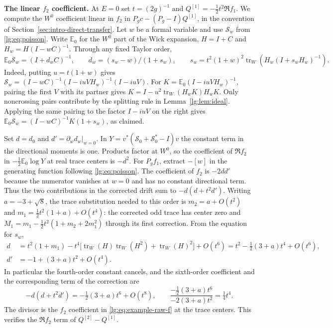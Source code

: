 \documentclass[11pt]{article}
\numberwithin{equation}{section}
\theoremstyle{remark}
\newcommand{\E}{\mathbb E}
\begin{document}
\medskip\noindent\textbf{The linear $f_2$ coefficient.}
At $E=0$ set $t=(2g)^{-1}$ and $Q^{[1]}=-\tfrac12 t^2\Re f_1$.
We compute the $W^0$ coefficient linear in $f_2$ in
$P_gc-(P_g-I)Q^{[1]}$, in the convention of Section~\ref{sec:intro-direct-transfer}.
Let $w$ be a formal variable and use $\mathcal S_w$ from \eqref{lg:eq:poisson}.
Write $\E_0$ for the $W^0$ part of the Wick expansion,
$H=I+C$ and $H_w=H(I-wC)^{-1}$. Through any fixed Taylor order,
\[
 \E_0\mathcal S_w=(I+d_w C)^{-1},\qquad
 d_w=(s_w-w)/(1+s_w),\qquad
 s_w=t^2(1+w)^2\operatorname{tr}_W\!\left(H_w(I+s_w H_w)^{-1}\right).
\]
Indeed, putting $u=t(1+w)$ gives
$\mathcal S_w=(I-wC)^{-1}(I-iuVH_w)^{-1}(I-iuV)$.
For $K=\E_0(I-iuVH_w)^{-1}$, pairing the first $V$ with its partner gives
$K=I-u^2\operatorname{tr}_W(H_wK)H_wK$.
Only noncrossing pairs contribute by the splitting rule in
Lemma~\ref{lg:lem:ideal}. Applying the same pairing to the factor
$I-iuV$ on the right gives
$\E_0\mathcal S_w=(I-wC)^{-1}K(1+s_w)$, as claimed.

Set $d=d_0$ and $d'=\partial_w d_w|_{w=0}$.
In $Y=v^*(\mathcal S_0+\mathcal S_0^*-I)v$ the constant term in the
directional moments is one. Products factor at $W^0$, so the coefficient
of $\Re f_2$ in $-\tfrac12\E_0\log Y$ at real trace centers is $-d^2$.
For $P_g f_1$, extract $-[w]$ in the generating function following
\eqref{lg:eq:poisson}. The coefficient of $f_2$ is $-2dd'$ because
the numerator vanishes at $w=0$ and has no constant directional term.
Thus the two contributions in the corrected drift sum to $-d(d+t^2d')$.
Writing $a=-3+\sqrt8$, the trace substitution needed to this order is
$m_2=a+O(t^2)$ and $m_1=\tfrac12 t^2(1+a)+O(t^4)$: the corrected
odd trace has center zero and $M_1=m_1-\tfrac12t^2(1+m_2+2m_1^2)$
through its first correction. From the equation for $s_w$,
\[
 \begin{aligned}
 d&=t^2(1+m_1)-t^4\bigl[\operatorname{tr}_W(H)\operatorname{tr}_W(H^2)+
             \operatorname{tr}_W(H)^2\bigr]+O(t^6)
   =t^2-\tfrac12(3+a)t^4+O(t^6),\\
 d'&=-1+(3+a)t^2+O(t^4).
 \end{aligned}
\]
In particular the fourth-order constant cancels, and the sixth-order
coefficient and the corresponding term of the correction are
\begin{equation}\label{lg:eq:first-even-drift}
 -d(d+t^2d')=-\tfrac12(3+a)t^6+O(t^8),\qquad
 \frac{-\tfrac12(3+a)t^6}{-2(3+a)t^2}=\tfrac14 t^4.
\end{equation}
The divisor is the $f_2$ coefficient in \eqref{lg:eq:example-raw-f}
at the trace centers. This verifies the $\Re f_2$ term of
$Q^{[2]}-Q^{[1]}$.
\end{document}
